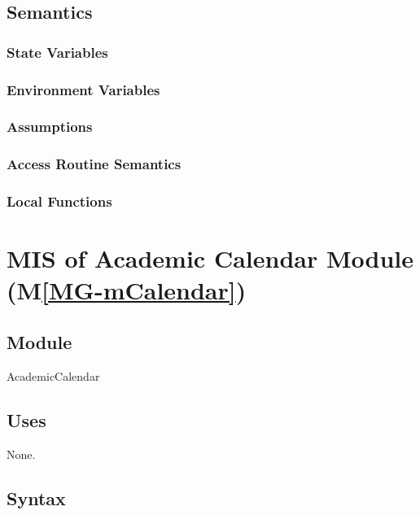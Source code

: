 \documentclass[12pt, titlepage]{article}
\newcommand{\mref}[1]{M\ref{MG-#1}}
\begin{document}
\subsection{Semantics}

\subsubsection{State Variables}


\subsubsection{Environment Variables}


\subsubsection{Assumptions}

\subsubsection{Access Routine Semantics}

\subsubsection{Local Functions}

\newpage

\section{MIS of Academic Calendar Module (\mref{mCalendar})} \label{mis-mCalendar}

\subsection{Module}

AcademicCalendar

\subsection{Uses}

None.

\subsection{Syntax}
\end{document}

